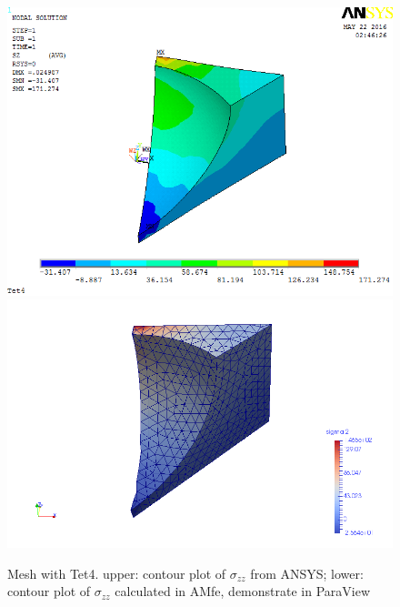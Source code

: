 \begin{figure}[htbp]
	\begin{center}
		\includegraphics[width=13cm,clip]{Tet4Szz.png} 		
		\includegraphics[width=13cm,clip]{Tet4SzzP.png} 		
		\caption{Mesh with Tet4. upper: contour plot of $\sigma_{zz}$ from ANSYS; lower: contour plot of $\sigma_{zz}$ calculated in AMfe, demonstrate in ParaView} \label{fig: Tet4Szz}
	\end{center}
\end{figure}
\clearpage 

